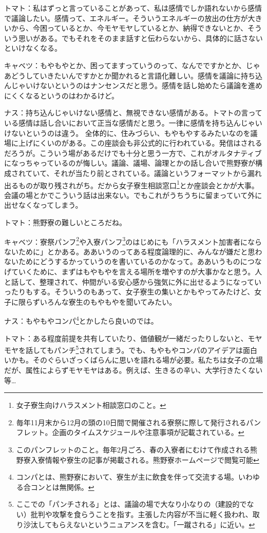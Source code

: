 トマト：私はずっと言っていることがあって、私は感情でしか語れないから感情で議論したい。感情って、エネルギー。そういうエネルギーの放出の仕方が大きいから、今困っているとか、今モヤモヤしているとか、納得できないとか、そういう思いがある。でもそれをそのまま話すと伝わらないから、具体的に話さないといけなくなる。

キャベツ：もやもやとか、困ってますっていうのって、なんでですかとか、じゃあどうしていきたいんですかとか聞かれると言語化難しい。感情を議論に持ち込んじゃいけないというのはナンセンスだと思う。感情を話し始めたら議論を進めにくくなるというのはわかるけど。

ナス：持ち込んじゃいけない感情と、無視できない感情がある。トマトの言っている感情は話し合いにおいて正当な感情だと思う。一律に感情を持ち込んじゃいけないというのは違う。
全体的に、住みづらい、もやもやするみたいなのを議場に上げにくいのがある。この座談会も非公式的に行われている。発信はされるだろうが。こういう場があるだけでも十分と思う一方で、これがオルタナティブになっちゃっているのが悔しい。議論、議場、論理とかの話し合いで熊野寮が構成されていて、それが当たり前とされている。議論というフォーマットから漏れ出るものが取り残されがち。だから女子寮生相談窓口\footnote[5]{女子寮生向けハラスメント相談窓口のこと。}とか座談会とかが大事。会議の場とかでこういう話は出来ない。でもこれがうちうちに留まっていて外に出せなくなってしまう。

トマト：熊野寮の難しいところだね。

キャベツ：寮祭パンフ\footnote[6]{毎年11月末から12月の頭の10日間で開催される寮祭に際して発行されるパンフレット。企画のタイムスケジュールや注意事項が記載されている。}や入寮パンフ\footnote[7]{このパンフレットのこと。毎年2月ごろ、春の入寮者にむけて作成される熊野寮入寮情報や寮生の記事が掲載される。熊野寮ホームページで閲覧可能}のはじめにも「ハラスメント加害者にならないために」とかある。ああいうのってある程度論理的に、みんなが嫌だと思わないためにどうするかっていうのを書いているのかなって。ああいうものにつなげていくために、まずはもやもやを言える場所を増やすのが大事かなと思う。人と話して、整理されて、仲間がいる安心感から強気に外に出せるようになっていったりもする。そういうのもあって、女子寮生の集いとかもやってみたけど、女子に限らずいろんな寮生のもやもやを聞いてみたい。

ナス：もやもやコンパ\footnote[8]{コンパとは、熊野寮において、寮生が主に飲食を伴って交流する場。いわゆる合コンとは無関係。}とかしたら良いのでは。

トマト：ある程度前提を共有していたり、価値観が一緒だったりしないと、モヤモヤを話してもパンチ\footnote[9]{ここでの「パンチされる」とは、議論の場で大なり小なりの（建設的でない）批判や攻撃を食らうことを指す。主張した内容が不当に軽く扱われ、取り沙汰してもらえないというニュアンスを含む。「一蹴される」に近い。}されてしまう。でも、もやもやコンパのアイデアは面白いかも。そのぐらいざっくばらんに思いを語れる場が必要。私たちは女子の立場だが、属性によらずモヤモヤはある。例えば、生きるの辛い、大学行きたくない等…

